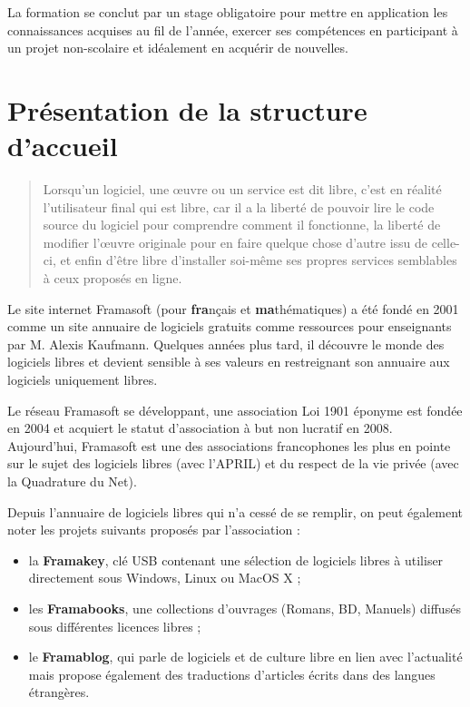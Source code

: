 \documentclass[10pt,a4paper]{report}
\begin{document}
	La formation se conclut par un stage obligatoire pour mettre en application les connaissances acquises au fil de l'année, exercer ses compétences en participant à un projet non-scolaire et idéalement en acquérir de nouvelles.
	
	\section{Présentation de la structure d'accueil}
	
	\begin{quote}
		Lorsqu'un logiciel, une œuvre ou un service est dit libre, c'est en réalité l'utilisateur final qui est libre, car il a la liberté de pouvoir lire le code source du logiciel pour comprendre comment il fonctionne, la liberté de modifier l'œuvre originale pour en faire quelque chose d'autre issu de celle-ci, et enfin d'être libre d'installer soi-même ses propres services semblables à ceux proposés en ligne.
	\end{quote}
	
	Le site internet Framasoft (pour \textbf{fra}nçais et \textbf{ma}thématiques) a été fondé en 2001 comme un site annuaire de logiciels gratuits comme ressources pour enseignants par M. Alexis Kaufmann. Quelques années plus tard, il découvre le monde des logiciels libres et devient sensible à ses valeurs en restreignant son annuaire aux logiciels uniquement libres.
	
	Le réseau Framasoft se développant, une association Loi 1901 éponyme est fondée en 2004 et acquiert le statut d'association à but non lucratif en 2008. Aujourd'hui, Framasoft est une des associations francophones les plus en pointe sur le sujet des logiciels libres (avec l'APRIL) et du respect de la vie privée (avec la Quadrature du Net). 
	
	Depuis l'annuaire de logiciels libres qui n'a cessé de se remplir, on peut également noter les projets suivants proposés par l'association :
	\begin{itemize}
		\item la \textbf{Framakey}, clé USB contenant une sélection de logiciels libres à utiliser directement sous Windows, Linux ou MacOS X ;
		\item les \textbf{Framabooks}, une collections d'ouvrages (Romans, BD, Manuels) diffusés sous différentes licences libres ;
		\item le \textbf{Framablog}, qui parle de logiciels et de culture libre en lien avec l'actualité mais propose également des traductions d'articles écrits dans des langues étrangères.
	\end{itemize}
	
\end{document}
